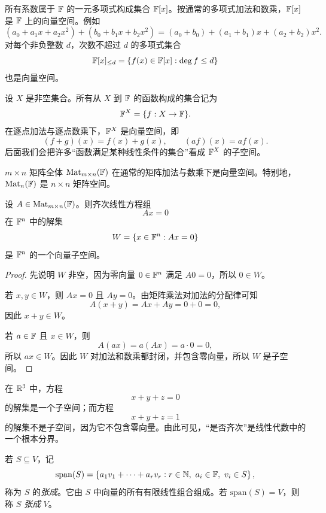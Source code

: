 \begin{example}[多项式空间]
所有系数属于 $\mathbb{F}$ 的一元多项式构成集合 $\mathbb{F}[x]$。按通常的多项式加法和数乘，$\mathbb{F}[x]$ 是 $\mathbb{F}$ 上的向量空间。例如
\[
(a_0+a_1x+a_2x^2)+(b_0+b_1x+b_2x^2)=(a_0+b_0)+(a_1+b_1)x+(a_2+b_2)x^2.
\]
对每个非负整数 $d$，次数不超过 $d$ 的多项式集合
\[
\mathbb{F}[x]_{\le d}=\{f(x)\in\mathbb{F}[x]:\deg f\le d\}
\]
也是向量空间。
\end{example}

\begin{example}[函数空间]
设 $X$ 是非空集合。所有从 $X$ 到 $\mathbb{F}$ 的函数构成的集合记为
\[
\mathbb{F}^X=\{f:X\to\mathbb{F}\}.
\]
在逐点加法与逐点数乘下，$\mathbb{F}^X$ 是向量空间，即
\[
(f+g)(x)=f(x)+g(x),\qquad (af)(x)=a f(x).
\]
后面我们会把许多“函数满足某种线性条件的集合”看成 $\mathbb{F}^X$ 的子空间。
\end{example}

\begin{example}[矩阵空间]
$m\times n$ 矩阵全体 $\mathrm{Mat}_{m\times n}(\mathbb{F})$ 在通常的矩阵加法与数乘下是向量空间。特别地，$\mathrm{Mat}_n(\mathbb{F})$ 是 $n\times n$ 矩阵空间。
\end{example}

\begin{proposition}[齐次线性方程组的解空间]
设 $A\in\mathrm{Mat}_{m\times n}(\mathbb{F})$。则齐次线性方程组
\[
Ax=0
\]
在 $\mathbb{F}^n$ 中的解集
\[
W=\{x\in\mathbb{F}^n:Ax=0\}
\]
是 $\mathbb{F}^n$ 的一个向量子空间。
\end{proposition}

\begin{proof}
先说明 $W$ 非空，因为零向量 $0\in\mathbb{F}^n$ 满足 $A0=0$，所以 $0\in W$。

若 $x,y\in W$，则 $Ax=0$ 且 $Ay=0$。由矩阵乘法对加法的分配律可知
\[
A(x+y)=Ax+Ay=0+0=0,
\]
因此 $x+y\in W$。

若 $a\in\mathbb{F}$ 且 $x\in W$，则
\[
A(ax)=a(Ax)=a\cdot 0=0,
\]
所以 $ax\in W$。因此 $W$ 对加法和数乘都封闭，并包含零向量，所以 $W$ 是子空间。
\end{proof}

\begin{example}[齐次系统与非齐次系统]
在 $\mathbb{R}^3$ 中，方程
\[
x+y+z=0
\]
的解集是一个子空间；而方程
\[
x+y+z=1
\]
的解集不是子空间，因为它不包含零向量。由此可见，“是否齐次”是线性代数中的一个根本分界。
\end{example}

\begin{notation}
若 $S\subseteq V$，记
\[
\mathrm{span}(S)=\left\{a_1v_1+\cdots+a_rv_r: r\in\mathbb{N},\ a_i\in\mathbb{F},\ v_i\in S\right\},
\]
称为 $S$ 的\emph{张成}。它由 $S$ 中向量的所有有限线性组合组成。若 $\mathrm{span}(S)=V$，则称 $S$ \emph{张成} $V$。
\end{notation}

